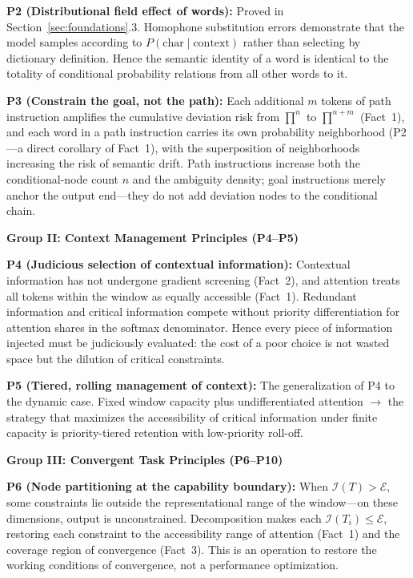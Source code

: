 \documentclass[11pt,a4paper]{article}
\theoremstyle{definition}
\newcommand{\effcap}{\mathcal{E}}
\begin{document}
\textbf{P2 (Distributional field effect of words):} Proved in Section~\ref{sec:foundations}.3. Homophone substitution errors demonstrate that the model samples according to $P(\text{char} \mid \text{context})$ rather than selecting by dictionary definition. Hence the semantic identity of a word is identical to the totality of conditional probability relations from all other words to it.

\textbf{P3 (Constrain the goal, not the path):} Each additional $m$ tokens of path instruction amplifies the cumulative deviation risk from $\prod^n$ to $\prod^{n+m}$ (Fact~1), and each word in a path instruction carries its own probability neighborhood (P2---a direct corollary of Fact~1), with the superposition of neighborhoods increasing the risk of semantic drift. Path instructions increase both the conditional-node count $n$ and the ambiguity density; goal instructions merely anchor the output end---they do not add deviation nodes to the conditional chain.

\medskip
\textbf{Group II: Context Management Principles (P4--P5)}

\textbf{P4 (Judicious selection of contextual information):} Contextual information has not undergone gradient screening (Fact~2), and attention treats all tokens within the window as equally accessible (Fact~1). Redundant information and critical information compete without priority differentiation for attention shares in the softmax denominator. Hence every piece of information injected must be judiciously evaluated: the cost of a poor choice is not wasted space but the dilution of critical constraints.

\textbf{P5 (Tiered, rolling management of context):} The generalization of P4 to the dynamic case. Fixed window capacity plus undifferentiated attention $\rightarrow$ the strategy that maximizes the accessibility of critical information under finite capacity is priority-tiered retention with low-priority roll-off.

\medskip
\textbf{Group III: Convergent Task Principles (P6--P10)}

\textbf{P6 (Node partitioning at the capability boundary):} When $\mathcal{I}(T) > \effcap$, some constraints lie outside the representational range of the window---on these dimensions, output is unconstrained. Decomposition makes each $\mathcal{I}(T_i) \leq \effcap$, restoring each constraint to the accessibility range of attention (Fact~1) and the coverage region of convergence (Fact~3). This is an operation to restore the working conditions of convergence, not a performance optimization.
\end{document}
